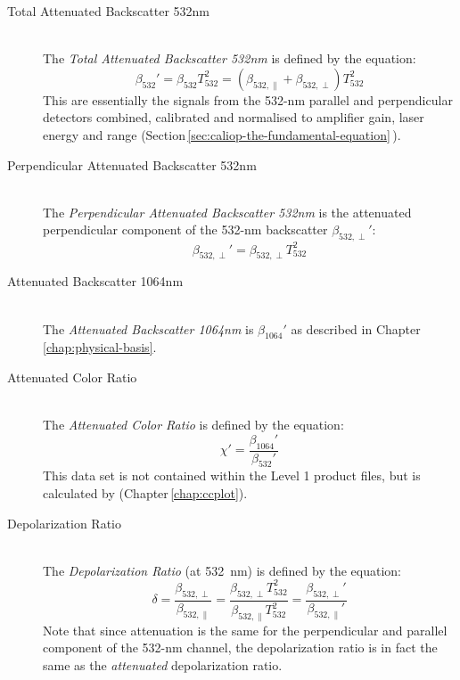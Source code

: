 \begin{description}
\item[Total Attenuated Backscatter 532nm]\hfill\\
The \textit{Total Attenuated Backscatter 532nm} is defined by the equation:
\begin{equation}
\beta_{532}' = \beta_{532} T_{532}^2 = (\beta_{532,\parallel} + \beta_{532,\perp}) T_{532}^2
\end{equation}
This are essentially the signals from the 532-nm parallel and perpendicular detectors combined,
calibrated and normalised to amplifier gain, laser energy and range (Section\,\ref{sec:caliop-the-fundamental-equation}\,).

\item[Perpendicular Attenuated Backscatter 532nm]\hfill\\
The \textit{Perpendicular Attenuated Backscatter 532nm} is the attenuated perpendicular component
of the 532-nm backscatter $\beta_{532,\perp}'$:
\begin{equation}
\beta_{532,\perp}' = \beta_{532,\perp} T_{532}^2
\end{equation}

\item[Attenuated Backscatter 1064nm]\hfill\\
The \textit{Attenuated Backscatter 1064nm} is $\beta_{1064}'$ as described in Chapter\,\ref{chap:physical-basis}.

\item[Attenuated Color Ratio]\hfill\\
The \textit{Attenuated Color Ratio} is defined by the equation:
\begin{equation}
\chi' = \frac{\beta_{1064}'}{\beta_{532}'}
\end{equation}
This data set is not contained within the Level 1 product files, but is calculated by \ccplot (Chapter\,\ref{chap:ccplot}).

\item[Depolarization Ratio]\hfill\\
The \textit{Depolarization Ratio} (at \SI{532}{nm}) is defined by the equation:
\begin{equation}
\delta = \frac{\beta_{532,\perp}}{\beta_{532,\parallel}} = \frac{\beta_{532,\perp}T_{532}^2}{\beta_{532,\parallel}T_{532}^2} = \frac{\beta_{532,\perp}'}{\beta_{532,\parallel}'}
\end{equation}
Note that since attenuation is the same for the perpendicular and parallel component of the 532-nm channel,
the depolarization ratio is in fact the same as the \textit{attenuated} depolarization ratio.

\end{description}


